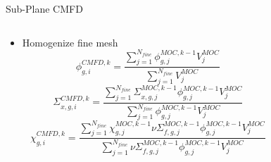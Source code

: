 \begin{frame}[t]{Sub-Plane CMFD}
    
    \begin{columns}
      \begin{column}{0.6\textwidth}
        \begin{itemize}
          \item Homogenize fine mesh
          \begin{equation*}\scriptstyle
          \phi_{g,i}^{CMFD,k} = \frac{\sum_{j=1}^{N_{fine}} 
          \phi_{g,j}^{MOC,k-1} V_j^{MOC}}{\sum_{j=1}^{N_{fine}} V_j^{MOC}}
          \end{equation*}
          \begin{equation*}\scriptstyle
          \Sigma_{x,g,i}^{CMFD,k} = \frac{\sum_{j=1}^{N_{fine}} 
            \Sigma_{x,g,j}^{MOC,k-1} \phi_{g,j}^{MOC,k-1} 
            V_j^{MOC}}{\sum_{j=1}^{N_{fine}} \phi_{g,j}^{MOC,k-1} V_j^{MOC}}
          \end{equation*}
          \begin{equation*}\scriptstyle
          \chi_{g,i}^{CMFD,k} = \frac{\sum_{j=1}^{N_{fine}} 
            \chi_{g,j}^{MOC,k-1} \nu\Sigma_{f,g,j}^{MOC,k-1} 
            \phi_{g,j}^{MOC,k-1} 
            V_j^{MOC}}{\sum_{j=1}^{N_{fine}} \nu\Sigma_{f,g,j}^{MOC,k-1} 
            \phi_{g,j}^{MOC,k-1} V_j^{MOC}}
          \end{equation*}
        \end{itemize}
      \end{column}
    \begin{column}{0.4\textwidth}
      \begin{figure}[h]
        \centering
        \resizebox{!}{0.7\textheight}{}
      \end{figure}
  \end{column}
  \end{columns}
    
\end{frame}


